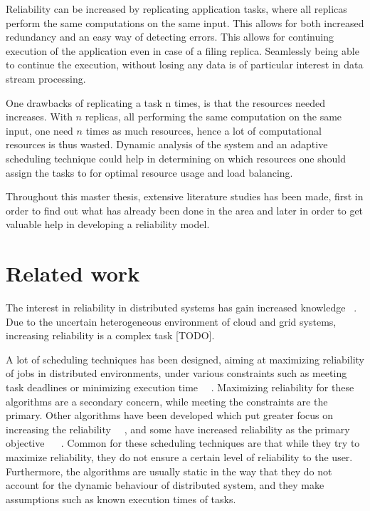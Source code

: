\documentclass{cslthse-msc}
\begin{document}
Reliability can be increased by replicating application tasks, where all replicas perform the same computations on the same input. This allows for both increased redundancy and an easy way of detecting errors. This allows for continuing execution of the application even in case of a filing replica. Seamlessly being able to continue the execution, without losing any data is of particular interest in data stream processing.

One drawbacks of replicating a task n times, is that the resources needed increases. With $n$ replicas, all performing the same computation on the same input, one need $n$ times as much resources, hence a lot of computational resources is thus wasted. Dynamic analysis of the system and an adaptive scheduling technique could help in determining on which resources one should assign the tasks to for optimal resource usage and load balancing. 

Throughout this master thesis, extensive literature studies has been made, first in order to find out what has already been done in the area and later in order to get valuable help in developing a reliability model.

\section{Related work} \label{sec:introduction_related_work}
The interest in reliability in distributed systems has gain increased knowledge ~\cite{replicationManagement}. Due to the uncertain heterogeneous environment of cloud and grid systems, increasing reliability is a complex task [TODO]. %

A lot of scheduling techniques has been designed, aiming at maximizing reliability of jobs in distributed environments, under various constraints such as meeting task deadlines or minimizing execution time~\cite{algoOptTimeMaxRel} \cite{optTaskAllocationForMaxRel} \cite{taskAllocation} \cite{taskAllocationSwarm} \cite{algoMaxRelEndToEndConstraint} \cite{algoMinExTime} ~\cite{schedReplicas}. Maximizing reliability for these algorithms are a secondary concern, while meeting the constraints are the primary. Other algorithms have been developed which put greater focus on increasing the reliability~\cite{optResourceAllMaxPerformance} ~\cite{matchSchedAlgoMinFailure}, and some have increased reliability as the primary objective ~\cite{safetyRelTaskAllocation} ~\cite{improvedTaskAllMaxRel}. Common for these scheduling techniques are that while they try to maximize reliability, they do not ensure a certain level of reliability to the user. Furthermore, the algorithms are usually static in the way that they do not account for the dynamic behaviour of distributed system, and they make assumptions such as known execution times of tasks.
\end{document}
